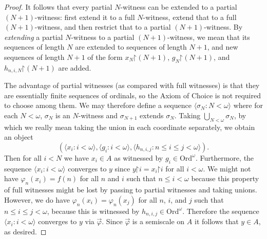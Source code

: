 \documentclass[fleqn, 11pt]{amsart}
\theoremstyle{plain}
\newtheorem{lem}[thm]{Lemma} \newtheorem*{lem*}{Lemma}
\theoremstyle{definition}
\theoremstyle{remark}
\newcommand{\Ord}{\mathrm{Ord}}
\newcommand{\restrict}{\mathord{\restriction}}
\DeclareMathOperator{\p}{p}
\begin{document}
\begin{proof}
It follows that every partial $N$-witness can be extended to a partial $(N+1)$-witness:
first extend it to a full $N$-witness, extend that to a full $(N+1)$-witness, and then restrict that to a partial $(N+1)$-witness.
By \emph{extending} a partial $N$-witness to a partial $(N+1)$-witness, we mean that its sequences of length $N$ are extended to sequences of length $N+1$, and 
new sequences of length $N+1$
of the form $x_N \restrict (N+1)$, $g_N \restrict (N+1)$, and $h_{n,i,N} \restrict (N+1)$ are added.

The advantage of partial witnesses (as compared with full witnesses) is that they are essentially finite sequences of ordinals, so the Axiom of Choice is not required to choose among them.
We may therefore define a sequence $\langle\sigma_N : N < \omega\rangle$ where for each $N < \omega$, $\sigma_N$ is an $N$-witness and $\sigma_{N+1}$ extends $\sigma_N$.
Taking $\bigcup_{N < \omega} \sigma_N$, by which we really mean taking the union in each coordinate separately, we obtain an object
\[ ( \langle x_i : i < \omega\rangle, \langle g_i : i < \omega\rangle, \langle h_{n,i,j} : n \le i \le j < \omega\rangle). \]
Then for all $i < N$ we have
$x_i \in A$ as witnessed by $g_i \in \Ord^\omega$.
Furthermore, the sequence
$\langle x_i : i < \omega\rangle$ converges to $y$ since
$y \restrict i = x_i \restrict i$ for all $i < \omega$.
We might not have 
$\varphi_n(x_i) = f(n)$ for all $n$ and $i$ such that $n \le i < \omega$ because this property of full witnesses might be lost by passing to partial witnesses and taking unions.
However, we do have $\varphi_n(x_i) = \varphi_n(x_j)$ for all $n$, $i$, and $j$ such that $n \le i \le j < \omega$, because this is witnessed by 
$h_{n,i,j} \in \Ord^\omega$.
Therefore the sequence $\langle x_i : i < \omega\rangle$ converges to $y$ via $\vec{\varphi}$.
Since $\vec{\varphi}$ is a semiscale on $A$ it follows that $y \in A$, as desired.
\end{proof}



\end{document}

